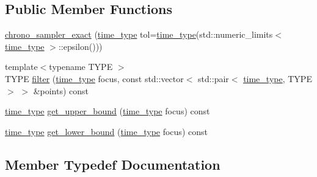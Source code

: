 \subsection*{Public Member Functions}
\begin{DoxyCompactItemize}
\item 
\hyperlink{classmui_1_1chrono__sampler__exact_ad1293d1816ab17b696ed8c1d665c9cae}{chrono\+\_\+sampler\+\_\+exact} (\hyperlink{classmui_1_1chrono__sampler__exact_a5f9178b26822fe901f8a1e97ada68d95}{time\+\_\+type} tol=\hyperlink{classmui_1_1chrono__sampler__exact_a5f9178b26822fe901f8a1e97ada68d95}{time\+\_\+type}(std\+::numeric\+\_\+limits$<$ \hyperlink{classmui_1_1chrono__sampler__exact_a5f9178b26822fe901f8a1e97ada68d95}{time\+\_\+type} $>$\+::epsilon()))
\item 
{\footnotesize template$<$typename T\+Y\+PE $>$ }\\T\+Y\+PE \hyperlink{classmui_1_1chrono__sampler__exact_a8bef847fd06c25c4f8869b0a962a6193}{filter} (\hyperlink{classmui_1_1chrono__sampler__exact_a5f9178b26822fe901f8a1e97ada68d95}{time\+\_\+type} focus, const std\+::vector$<$ std\+::pair$<$ \hyperlink{classmui_1_1chrono__sampler__exact_a5f9178b26822fe901f8a1e97ada68d95}{time\+\_\+type}, T\+Y\+PE $>$ $>$ \&points) const
\item 
\hyperlink{classmui_1_1chrono__sampler__exact_a5f9178b26822fe901f8a1e97ada68d95}{time\+\_\+type} \hyperlink{classmui_1_1chrono__sampler__exact_a1743254818f1f6fb5ef3eff5e7eef0c6}{get\+\_\+upper\+\_\+bound} (\hyperlink{classmui_1_1chrono__sampler__exact_a5f9178b26822fe901f8a1e97ada68d95}{time\+\_\+type} focus) const
\item 
\hyperlink{classmui_1_1chrono__sampler__exact_a5f9178b26822fe901f8a1e97ada68d95}{time\+\_\+type} \hyperlink{classmui_1_1chrono__sampler__exact_a1297822afb4c05df461926a4d234a61d}{get\+\_\+lower\+\_\+bound} (\hyperlink{classmui_1_1chrono__sampler__exact_a5f9178b26822fe901f8a1e97ada68d95}{time\+\_\+type} focus) const
\end{DoxyCompactItemize}


\subsection{Member Typedef Documentation}
\mbox{\label{classmui_1_1chrono__sampler__exact_a1765b8d8fec705157ac526e186727e9a}} 
